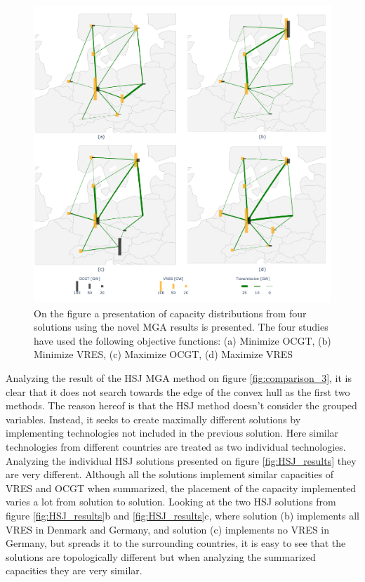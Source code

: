 \begin{figure}[h]\centering
	\includegraphics[width=1.\textwidth,trim={0 0cm 0 0cm},clip]{./Images/MGA_sum}
	\caption{On the figure a presentation of capacity distributions from four solutions using the novel MGA results is presented. The four studies have used the following objective functions: (a) Minimize OCGT, (b) Minimize VRES, (c) Maximize OCGT, (d) Maximize VRES}
	\label{fig:MGA_sum_results}
\end{figure}


Analyzing the result of the HSJ MGA method on figure \ref{fig:comparison_3}, it is clear that it does not search towards the edge of the convex hull as the first two methods. The reason hereof is that the HSJ method doesn't consider the grouped variables. Instead, it seeks to create maximally different solutions by implementing technologies not included in the previous solution. Here similar technologies from different countries are treated as two individual technologies. Analyzing the individual HSJ solutions presented on figure \ref{fig:HSJ_results} they are very different. Although all the solutions implement similar capacities of VRES and OCGT when summarized, the placement of the capacity implemented varies a lot from solution to solution. Looking at the two HSJ solutions from figure \ref{fig:HSJ_results}b and \ref{fig:HSJ_results}c, where solution (b) implements all VRES in Denmark and Germany, and solution (c) implements no VRES in Germany, but spreads it to the surrounding countries, it is easy to see that the solutions are topologically different but when analyzing the summarized capacities they are very similar. 

